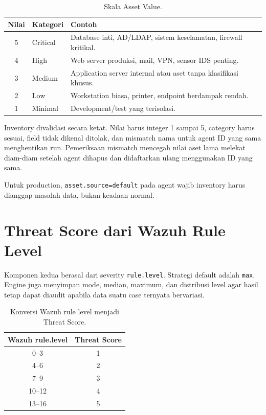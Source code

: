 \documentclass[11pt,a4paper,oneside]{report}
\DeclareRobustCommand{\code}[1]{\nolinkurl{#1}}
\begin{document}
\begin{table}[ht]
\centering
\caption{Skala Asset Value.}
\begin{tabularx}{0.88\textwidth}{c l X}
\toprule
\textbf{Nilai} & \textbf{Kategori} & \textbf{Contoh}\\
\midrule
5 & Critical & Database inti, AD/LDAP, sistem keselamatan, firewall kritikal.\\
4 & High & Web server produksi, mail, VPN, sensor IDS penting.\\
3 & Medium & Application server internal atau aset tanpa klasifikasi khusus.\\
2 & Low & Workstation biasa, printer, endpoint berdampak rendah.\\
1 & Minimal & Development/test yang terisolasi.\\
\bottomrule
\end{tabularx}
\end{table}

Inventory divalidasi secara ketat. Nilai harus integer 1 sampai 5, category harus
sesuai, field tidak dikenal ditolak, dan mismatch nama untuk agent ID yang sama
menghentikan run. Pemeriksaan mismatch mencegah nilai aset lama melekat diam-diam
setelah agent dihapus dan didaftarkan ulang menggunakan ID yang sama.

Untuk production, \code{asset.source=default} pada agent wajib inventory harus
dianggap masalah data, bukan keadaan normal.

\chapter{Threat Score dari Wazuh Rule Level}

Komponen kedua berasal dari severity \code{rule.level}. Strategi default adalah
\code{max}. Engine juga menyimpan mode, median, maximum, dan distribusi level agar
hasil tetap dapat diaudit apabila data suatu case ternyata bervariasi.

\begin{table}[ht]
\centering
\caption{Konversi Wazuh rule level menjadi Threat Score.}
\begin{tabular}{cc}
\toprule
\textbf{Wazuh rule.level} & \textbf{Threat Score}\\
\midrule
0--3 & 1\\
4--6 & 2\\
7--9 & 3\\
10--12 & 4\\
13--16 & 5\\
\bottomrule
\end{tabular}
\end{table}
\end{document}
